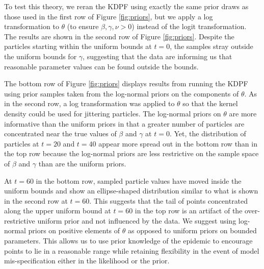 \documentclass{elsarticle}
\begin{document}
To test this theory, we reran the KDPF using exactly the same prior draws as those used in the first row of Figure \ref{fig:priors}, but we apply a log transformation to $\theta$ (to ensure $\beta,\gamma,\nu>0$) instead of the logit transformation. The results are shown in the second row of Figure \ref{fig:priors}. Despite the particles starting within the uniform bounds at $t=0$, the samples stray outside the uniform bounds for $\gamma$, suggesting that the data are informing us that reasonable parameter values can be found outside the bounds.

The bottom row of Figure \ref{fig:priors} displays results from running the KDPF using prior samples taken from the log-normal priors on the components of $\theta$. As in the second row, a log transformation was applied to $\theta$ so that the kernel density could be used for jittering particles. The log-normal priors on $\theta$ are more informative than the uniform priors in that a greater number of particles are concentrated near the true values of $\beta$ and $\gamma$ at $t = 0$. Yet, the distribution of particles at $t = 20$ and $t = 40$ appear more spread out in the bottom row than in the top row because the log-normal priors are less restrictive on the sample space of $\beta$ and $\gamma$ than are the uniform priors.

At $t = 60$ in the bottom row, sampled particle values have moved inside the uniform bounds and show an ellipse-shaped distribution similar to what is shown in the second row at $t = 60$. This suggests that the tail of points concentrated along the upper uniform bound at $t = 60$ in the top row is an artifact of the over-restrictive uniform prior and not influenced by the data. We suggest using log-normal priors on positive elements of $\theta$ as opposed to uniform priors on bounded parameters. This allows us to use prior knowledge of the epidemic to encourage points to lie in a reasonable range while retaining flexibility in the event of model mis-specification either in the likelihood or the prior.
\end{document}
